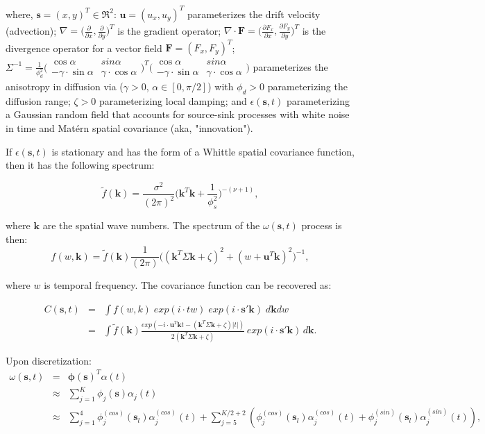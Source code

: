 \documentclass[letterpaper,portrait,11pt]{scrartcl}
\numberwithin{equation}{section}    %
\numberwithin{figure}{section}    %
\numberwithin{table}{section}       %
\begin{document}
\begin{appendices}
where, $\bm{s}=(x,y)^T \in \Re^2$: $\bm{u}=(u_x, u_y)^T$ parameterizes the drift velocity (advection); $\nabla = \Big( \frac{\partial}{\partial x}, \frac{\partial}{\partial y} \Big)^T$  is the gradient operator;  $\nabla \cdotp \bm{F} = \Big( \frac{\partial F_x}{\partial x}, \frac{\partial F_y}{\partial y} \Big)^T$ is the divergence operator for a vector field $\bm{F}=(F_x, F_y)^T$; $\Sigma^{-1} = \frac{1}{\phi^{2}_{d} }    
\Big( 
\begin{array}{cc}
\cos \alpha & sin \alpha \\ 
- \gamma \cdot \sin \alpha & \gamma \cdot \cos \alpha
\end{array} 
\Big)^T 
\Big( 
\begin{array}{cc}
\cos \alpha & sin \alpha \\ 
- \gamma \cdot \sin \alpha & \gamma \cdot \cos \alpha
\end{array} 
\Big) $ parameterizes the anisotropy in diffusion via ($\gamma > 0$, $\alpha \in [0,\pi/2]$) with $\phi_d > 0$  parameterizing the diffusion range; $\zeta > 0$ parameterizing local damping; and $\epsilon(\bm{s},t)$ parameterizing a Gaussian random field that accounts for source-sink processes with white noise in time and Mat\'{e}rn spatial covariance (aka, "innovation").

If $\epsilon(\bm{s},t)$ is stationary and has the form of a Whittle spatial covariance function, then it has the following spectrum:

\[
\tilde{f}(\bm{k}) = \frac {\sigma^2} {(2 \pi)^2} 
\Bigg(  
\bm{k}^T\bm{k} + \frac{1}{\phi_s^2}
\Bigg)^{-(\nu+1)},
\] 

where $\bm{k}$ are the spatial wave numbers. The spectrum of  the $\omega(\bm{s},t)$ process is then:
\[
f(w,\bm{k}) = \tilde{f}(\bm{k}) \frac {1} {(2 \pi)} 
\Big(  
(\bm{k}^T \Sigma \bm{k} + \zeta)^2 + (w + \bm{u}^T \bm{k} )^2 
\Big)^{-1} ,
\] 

where $w$ is temporal frequency. The covariance function can be recovered as:

\begin{eqnarray}
  C(\bm{s},t) &=& \int f(w,k) \; exp(i \cdot tw ) \; exp(i \cdot \bm{s}'\bm{k} ) \; d\bm{k} dw \\
  &=& \int \tilde{f}(\bm{k}) \frac{exp(-i \cdot \bm{u}^T \bm{k} t - (\bm{k}^T \Sigma \bm{k} + \zeta) |t| )} {2(\bm{k}^T \Sigma \bm{k} + \zeta) } \, exp( i \cdot \bm{s}' \bm{k} ) \, d\bm{k} .
\end{eqnarray}  


Upon discretization:
  \begin{eqnarray*}
    \omega(\bm{s},t)  &=& \bm{\phi}(\bm{s})^T \alpha(t) \\
    &\approx& \sum_{j=1}^{K} \phi_j(\bm{s}) \alpha_j(t)   \\
    &\approx& \sum_{j=1}^4 \phi_j^{(cos)} (\bm{s}_l) \alpha_j^{(cos)}(t) 
    + \sum_{j=5}^{K/2+2} (  \phi_j^{(cos)} (\bm{s}_l )\alpha_j^{(cos)}(t) +   \phi_j^{(sin)} (\bm{s}_l ) \alpha_j^{(sin)}(t) ) ,
  \end{eqnarray*}  
  

\end{appendices}
\end{document}
